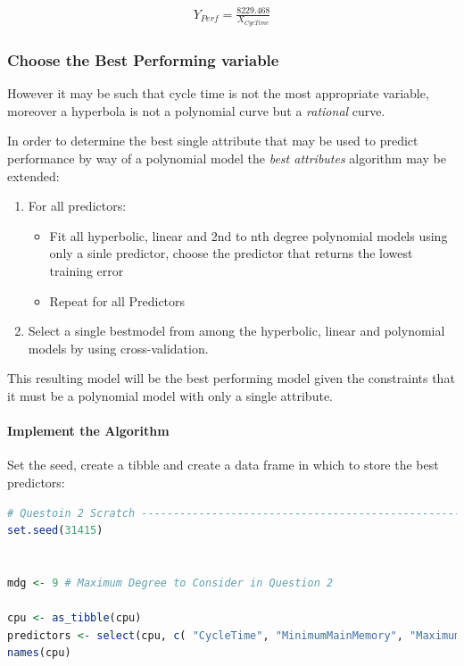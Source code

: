 \documentclass[
]{article}
\providecommand{\tightlist}{%
  \setlength{\itemsep}{0pt}\setlength{\parskip}{0pt}}
\begin{document}
\begin{align}
Y_{Perf} = \frac{8229.468}{X_{CycTime}} \label{hypcyc}
\end{align}


\hypertarget{choose-the-best-performing-variable}{%
\subsubsection{Choose the Best Performing
variable}\label{choose-the-best-performing-variable}}

However it may be such that cycle time is not the most appropriate
variable, moreover a hyperbola is not a polynomial curve but a \textit{rational} curve.

 In order to determine the best single attribute that may be
used to predict performance by way of a polynomial model the \emph{best
attributes} algorithm may be extended:

\begin{enumerate}
\def\labelenumi{\arabic{enumi}.}
\tightlist
\item
  For all predictors:

\begin{itemize}
\tightlist
\item
  Fit all hyperbolic, linear and 2nd to nth degree polynomial models
  using only a sinle predictor, choose the predictor that returns the
  lowest training error
\item
  Repeat for all Predictors
\end{itemize}


\def\labelenumi{\arabic{enumi}.}
\setcounter{enumi}{1}
\tightlist
\item
  Select a single bestmodel from among the hyperbolic, linear and
  polynomial models by using cross-validation.
\end{enumerate}

This resulting model will be the best performing model given the
constraints that it must be a polynomial model with only a single
attribute.

\hypertarget{implement-the-algorithm}{%
\paragraph{Implement the Algorithm}\label{implement-the-algorithm}}

Set the seed, create a tibble and create a data frame in which to store
the best predictors:

\begin{lstlisting}[language=R]
# Questoin 2 Scratch ------------------------------------------------------
set.seed(31415)


mdg <- 9 # Maximum Degree to Consider in Question 2

cpu <- as_tibble(cpu)
predictors <- select(cpu, c( "CycleTime", "MinimumMainMemory", "MaximumMainMemory", "CacheSize", "MinimumNumberOfChannels", "MaximumNumberOfChannels"))
names(cpu)
\end{lstlisting}
\end{document}
